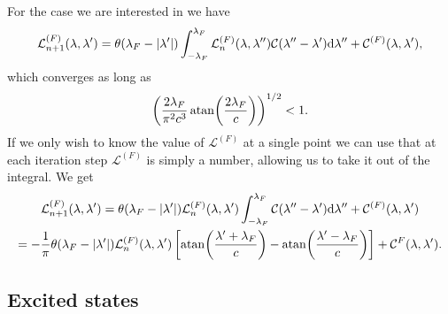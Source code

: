 \documentclass[11pt, a4paper]{report} %
\begin{document}
For the case we are interested in we have 
\begin{equation}
  \mathcal{L}^{(F)}_{n+1} (\lambda, \lambda') = \theta(\lambda_F - \abs{\lambda'}) \int_{-\lambda_F}^{\lambda_F} \mathcal{L}^{(F)}_n(\lambda, \lambda'') \mathcal{C} (\lambda''-\lambda') \dd \lambda'' + \mathcal{C}^{(F)}(\lambda, \lambda'),
\end{equation}
which converges as long as 
\begin{equation}
\left(\frac{2\lambda_F}{\pi^2c^3} \atan(\frac{2\lambda_F}{c})\right)^{1/2} < 1.
\end{equation}
If we only wish to know the value of $\mathcal{L}^{(F)}$ at a single point we can
use that at each iteration step $\mathcal{L}^{(F)}$ is simply a number, allowing us to take it out of the integral. 
We get
\begin{gather}
  \mathcal{L}^{(F)}_{n+1} (\lambda, \lambda') = \theta(\lambda_F - \abs{\lambda'})  \mathcal{L}^{(F)}_n(\lambda, \lambda') \int_{-\lambda_F}^{\lambda_F} \mathcal{C} (\lambda''-\lambda') \dd \lambda'' + \mathcal{C}^{(F)}(\lambda, \lambda')\\
= - \frac{1}{\pi} \theta(\lambda_F - \abs{\lambda'}) \mathcal{L}^{(F)}_n(\lambda, \lambda') \left[ \atan(\frac{\lambda'+\lambda_F}{c}) - \atan(\frac{\lambda'-\lambda_F}{c})\right] + \mathcal{C}^{F}(\lambda,\lambda').
\end{gather}

\subsection{Excited states}
\end{document}
